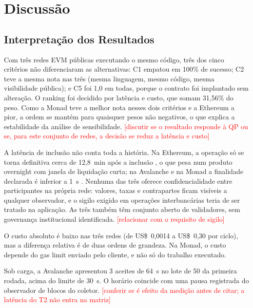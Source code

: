\documentclass[10pt,a4paper]{article}
\newcommand{\pendente}[1]{\textcolor{red}{[#1]}}
\begin{document}
\section{Discussão}\label{sec:discussao}

\subsection{Interpretação dos Resultados}

Com três redes EVM públicas executando o mesmo código, três dos cinco critérios não diferenciaram as alternativas: C1 empatou em 100\% de sucesso; C2 teve a mesma nota nas três (mesma linguagem, mesmo código, mesma visibilidade pública); e C5 foi 1,0 em todas, porque o contrato foi implantado sem alteração. O ranking foi decidido por latência e custo, que somam 31,56\% do peso. Como a Monad teve a melhor nota nesses dois critérios e a Ethereum a pior, a ordem se mantém para quaisquer pesos não negativos, o que explica a estabilidade da análise de sensibilidade. \pendente{discutir se o resultado responde à QP ou se, para este conjunto de redes, a decisão se reduz a latência e custo}

A latência de inclusão não conta toda a história. Na Ethereum, a operação só se torna definitiva cerca de 12,8~min após a inclusão \cite{ethereum2024gasper}, o que pesa num produto overnight com janela de liquidação curta; na Avalanche e na Monad a finalidade declarada é inferior a 1~s \cite{avalanche2024consensus,monad2024bft}. Nenhuma das três oferece confidencialidade entre participantes na própria rede: valores, taxas e contrapartes ficam visíveis a qualquer observador, e o sigilo exigido em operações interbancárias teria de ser tratado na aplicação. As três também têm conjunto aberto de validadores, sem governança institucional identificada. \pendente{relacionar com o requisito de sigilo}

O custo absoluto é baixo nas três redes (de US\$~0,0014 a US\$~0,30 por ciclo), mas a diferença relativa é de duas ordens de grandeza. Na Monad, o custo depende do gas limit enviado pelo cliente, e não só do trabalho executado.

Sob carga, a Avalanche apresentou 3 aceites de 64~s no lote de 50 da primeira rodada, acima do limite de 30~s. O horário coincide com uma pausa registrada do observador de blocos do coletor. \pendente{conferir se é efeito da medição antes de citar; a latência do T2 não entra na matriz}
\end{document}

